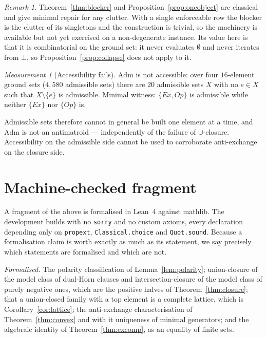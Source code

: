 \documentclass[11pt,reqno]{amsart}
\theoremstyle{plain}
\theoremstyle{definition}
\theoremstyle{remark}
\newtheorem{measurement}[theorem]{Measurement}
\newtheorem{remark}[theorem]{Remark}
\newcommand{\Admf}{\mathrm{Adm}}
\begin{document}
\begin{remark}
Theorem~\ref{thm:blocker} and Proposition~\ref{prop:oneobject} are classical and
give minimal repair for any clutter. With a single enforceable row the blocker is
the clutter of its singletons and the construction is trivial, so the machinery is
available but not yet exercised on a non-degenerate instance. Its value here is
that it is combinatorial on the ground set: it never evaluates $\emptyset$ and
never iterates from $\bot$, so Proposition~\ref{prop:collapse} does not apply to
it.
\end{remark}

\begin{measurement}[Accessibility fails]\label{meas:access}
$\Admf$ is not accessible: over four $16$-element ground sets ($4{,}580$ admissible
sets) there are $20$ admissible sets $X$ with no $e \in X$ such that
$X \setminus \{e\}$ is admissible. Minimal witness: $\{Ex, Op\}$ is admissible
while neither $\{Ex\}$ nor $\{Op\}$ is.
\end{measurement}

Admissible sets therefore cannot in general be built one element at a time, and
$\Admf$ is not an antimatroid --- independently of the failure of $\cup$-closure.
Accessibility on the admissible side cannot be used to corroborate anti-exchange
on the closure side.

\section{Machine-checked fragment}\label{sec:lean}

A fragment of the above is formalised in Lean~4 against mathlib. The
development builds with no \texttt{sorry} and no custom axioms, every
declaration depending only on \texttt{propext}, \texttt{Classical.choice} and
\texttt{Quot.sound}. Because a formalisation claim is worth exactly as much as
its statement, we say precisely which statements are formalised and which are
not.

\emph{Formalised.} The polarity classification of Lemma~\ref{lem:polarity};
union-closure of the model class of dual-Horn clauses and intersection-closure of
the model class of purely negative ones, which are the positive halves of
Theorem~\ref{thm:closure}; that a union-closed family with a top element is a
complete lattice, which is Corollary~\ref{cor:lattice}; the anti-exchange
characterisation of Theorem~\ref{thm:convex} and with it uniqueness of minimal
generators; and the algebraic identity of Theorem~\ref{thm:excomp}, as an
equality of finite sets.
\end{document}
